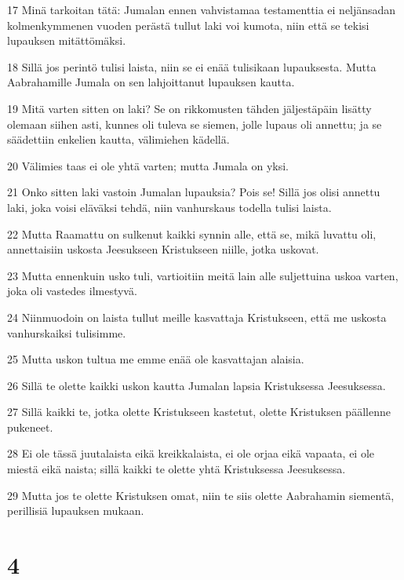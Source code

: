 \par 17 Minä tarkoitan tätä: Jumalan ennen vahvistamaa testamenttia ei neljänsadan kolmenkymmenen vuoden perästä tullut laki voi kumota, niin että se tekisi lupauksen mitättömäksi.
\par 18 Sillä jos perintö tulisi laista, niin se ei enää tulisikaan lupauksesta. Mutta Aabrahamille Jumala on sen lahjoittanut lupauksen kautta.
\par 19 Mitä varten sitten on laki? Se on rikkomusten tähden jäljestäpäin lisätty olemaan siihen asti, kunnes oli tuleva se siemen, jolle lupaus oli annettu; ja se säädettiin enkelien kautta, välimiehen kädellä.
\par 20 Välimies taas ei ole yhtä varten; mutta Jumala on yksi.
\par 21 Onko sitten laki vastoin Jumalan lupauksia? Pois se! Sillä jos olisi annettu laki, joka voisi eläväksi tehdä, niin vanhurskaus todella tulisi laista.
\par 22 Mutta Raamattu on sulkenut kaikki synnin alle, että se, mikä luvattu oli, annettaisiin uskosta Jeesukseen Kristukseen niille, jotka uskovat.
\par 23 Mutta ennenkuin usko tuli, vartioitiin meitä lain alle suljettuina uskoa varten, joka oli vastedes ilmestyvä.
\par 24 Niinmuodoin on laista tullut meille kasvattaja Kristukseen, että me uskosta vanhurskaiksi tulisimme.
\par 25 Mutta uskon tultua me emme enää ole kasvattajan alaisia.
\par 26 Sillä te olette kaikki uskon kautta Jumalan lapsia Kristuksessa Jeesuksessa.
\par 27 Sillä kaikki te, jotka olette Kristukseen kastetut, olette Kristuksen päällenne pukeneet.
\par 28 Ei ole tässä juutalaista eikä kreikkalaista, ei ole orjaa eikä vapaata, ei ole miestä eikä naista; sillä kaikki te olette yhtä Kristuksessa Jeesuksessa.
\par 29 Mutta jos te olette Kristuksen omat, niin te siis olette Aabrahamin siementä, perillisiä lupauksen mukaan.

\chapter{4}

